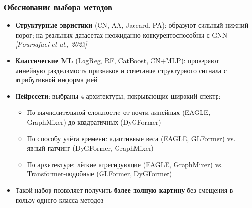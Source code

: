 \documentclass[aspectratio=169]{beamer}
\begin{document}
\begin{frame}
  \frametitle{Обоснование выбора методов}
  \begin{itemize}
    \item \textbf{Структурные эвристики} (CN, AA, Jaccard, PA): образуют сильный нижний порог; на реальных датасетах неожиданно конкурентоспособны с GNN \textit{[Poursafaei et al., 2022]}
    \item \textbf{Классические ML} (LogReg, RF, CatBoost, CN+MLP): проверяют линейную разделимость признаков и сочетание структурного сигнала с атрибутивной информацией
    \item \textbf{Нейросети}: выбраны 4 архитектуры, покрывающие широкий спектр:
      \begin{itemize}
        \item По вычислительной сложности: от почти линейных (EAGLE, GraphMixer) до квадратичных (DyGFormer)
        \item По способу учёта времени: адаптивные веса (EAGLE, GLFormer) vs. явный патчинг (DyGFormer, GraphMixer)
        \item По архитектуре: лёгкие агрегирующие (EAGLE, GraphMixer) vs. Transformer-подобные (GLFormer, DyGFormer)
      \end{itemize}
    \item Такой набор позволяет получить \textbf{более полную картину} без смещения в пользу одного класса методов
  \end{itemize}
\end{frame}

\end{document}
